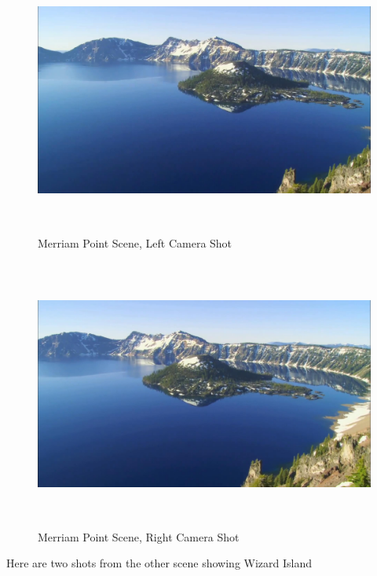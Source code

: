 \documentclass[11pt,psfig]{article}
\begin{document}
\begin{figure}[H]
\centering
\includegraphics[height=3.5in]{sfmPics1J2/shot4.jpg}
\caption{Merriam Point Scene, Left Camera Shot}
\end{figure}
\begin{figure}[H]
\centering
\includegraphics[height=3.5in]{sfmPics1J2/shot26.jpg}
\caption{Merriam Point Scene, Right Camera Shot}
\end{figure}

\newpage

Here are two shots from the other scene showing Wizard Island
\end{document}
